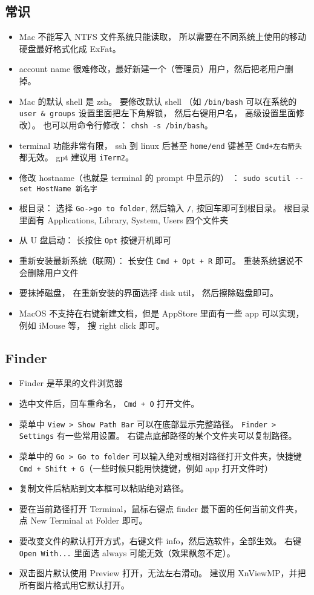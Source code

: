 \subsection{常识}
\begin{itemize}
\item Mac 不能写入 NTFS 文件系统只能读取， 所以需要在不同系统上使用的移动硬盘最好格式化成 ExFat。
\item account name 很难修改，最好新建一个（管理员）用户，然后把老用户删掉。
\item Mac 的默认 shell 是 zsh。 要修改默认 shell （如 \verb|/bin/bash| 可以在系统的 \verb|user & groups| 设置里面把左下角解锁， 然后右键用户名， 高级设置里面修改）。 也可以用命令行修改： \verb|chsh -s /bin/bash|。
\item terminal 功能非常有限， ssh 到 linux 后甚至 \verb|home/end| 键甚至 \verb|Cmd+左右箭头| 都无效。 gpt 建议用 \verb|iTerm2|。
\item 修改 hostname（也就是 terminal 的 prompt 中显示的） ： \verb|sudo scutil --set HostName 新名字|
\item 根目录： 选择 \verb|Go->go to folder|, 然后输入 \verb|/|, 按回车即可到根目录。 根目录里面有 Applications, Library, System, Users 四个文件夹
\item 从 U 盘启动： 长按住 \verb`Opt` 按键开机即可
\item 重新安装最新系统（联网）： 长安住 \verb|Cmd + Opt + R| 即可。 重装系统据说不会删除用户文件
\item 要抹掉磁盘， 在重新安装的界面选择 disk util， 然后擦除磁盘即可。
\item MacOS 不支持在右键新建文档，但是 AppStore 里面有一些 app 可以实现， 例如 iMouse 等， 搜 right click 即可。
\end{itemize}

\subsection{Finder}
\begin{itemize}
\item Finder 是苹果的文件浏览器
\item 选中文件后，回车重命名， \verb`Cmd + O` 打开文件。
\item 菜单中 \verb|View > Show Path Bar| 可以在底部显示完整路径。 \verb`Finder > Settings` 有一些常用设置。 右键点底部路径的某个文件夹可以复制路径。
\item 菜单中的 \verb`Go > Go to folder` 可以输入绝对或相对路径打开文件夹，快捷键 \verb`Cmd + Shift + G`（一些时候只能用快捷键，例如 app 打开文件时）
\item 复制文件后粘贴到文本框可以粘贴绝对路径。
\item 要在当前路径打开 Terminal，鼠标右键点 finder 最下面的任何当前文件夹，点 New Terminal at Folder 即可。
\item 要改变文件的默认打开方式，右键文件 info，然后选软件，全部生效。 右键 \verb`Open With...` 里面选 always 可能无效（效果飘忽不定）。
\item 双击图片默认使用 Preview 打开，无法左右滑动。 建议用 XnViewMP，并把所有图片格式用它默认打开。
\end{itemize}

